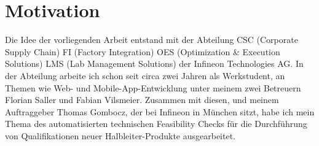 \section{Motivation}
Die Idee der vorliegenden Arbeit entstand mit der Abteilung CSC (Corporate Supply Chain) FI (Factory Integration) OES (Optimization & Execution Solutions) LMS (Lab Management Solutions) der Infineon Technologies AG. 
In der Abteilung arbeite ich schon seit circa zwei Jahren als Werkstudent, an Themen wie Web- und Mobile-App-Entwicklung unter meinem zwei Betreuern Florian Saller und Fabian Vilsmeier.
Zusammen mit diesen, und meinem Auftraggeber Thomas Gombocz, der bei Infineon in München sitzt, habe ich mein Thema des automatisierten technischen Feasibility Checks für die Durchführung von Qualifikationen neuer Halbleiter-Produkte ausgearbeitet.